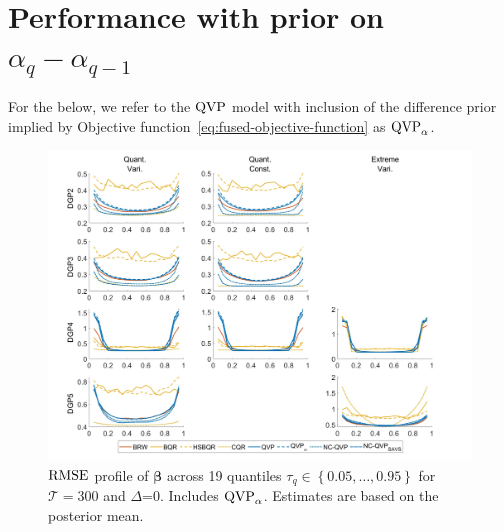 \clearpage

\section{Performance with prior on $\alpha_q-\alpha_{q-1}$}\label{subsubsec:alpha-predictions}

For the below, we refer to the $\operatorname{QVP}$ model with inclusion of the difference prior implied by Objective function~\ref{eq:fused-objective-function} as $\operatorname{QVP}_{\alpha}$.

\begin{figure}[H]
    \centering
    \includegraphics[width=0.9\linewidth]{AppFig/CoeffBiasSpecificv3_alpha.jpg}
    \caption{$\operatorname{RMSE}$ profile of $\boldsymbol{\beta}$ across 19 quantiles $\tau_q \in \left\{0.05,\dotsc,0.95\right\}$ for $\mathcal{T}=300$ and $\varDelta$=0. Includes $\operatorname{QVP}_\alpha$. Estimates are based on the posterior mean. }
    \label{fig:AlphaCoeffBias}
\end{figure}

